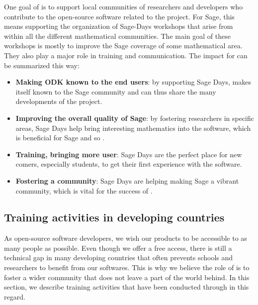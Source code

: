 \documentclass{deliverablereport}
\begin{document}
One goal of \ODK is to support local communities of researchers
and developers who contribute to the open-source software related to
the project. For Sage, this means supporting the organization of Sage-Days
workshops that arise from within all the different mathematical communities. The main 
goal of these workshops is mostly to improve the Sage coverage of some mathematical
area. They also play a major role in training and communication. The
impact for \ODK can be summarized this way:

\begin{itemize}
\item \textbf{Making ODK known to the end users}: by supporting Sage Days,
\ODK makes itself known to the Sage community and can
thus share the many developments of the project.

\item \textbf{Improving the overall quality of Sage}: by fostering researchers
in specific areas, Sage Days help bring interesting mathematics into
the software, which is beneficial for Sage and so \ODK.

\item \textbf{Training, bringing more user}: Sage Days are the perfect place
for new comers, especially students, to get their first experience with the software.

\item \textbf{Fostering a community}: Sage Days are helping making Sage a vibrant
community, which is vital for the success of \ODK.
\end{itemize}













\subsection{Training activities in developing countries}

As open-source software developers, we wish our products
to be accessible to as many people as possible. Even though we offer
 a free access, there is still a technical gap in many 
developing countries that 
often prevents schools and researchers to benefit from our softwares.
This is why we believe the role of \ODK is to foster 
a wider community that does not leave a part of the world behind. In 
this section, we describe training activities that have been conducted 
through \ODK in this regard.
\end{document}

